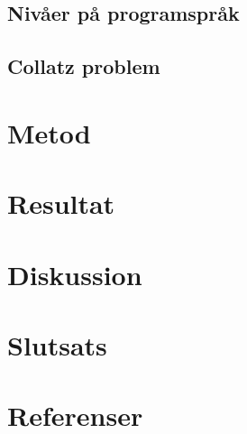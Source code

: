 \documentclass[12pt,swedish]{article}
\begin{document}
    \subsection{Nivåer på programspråk}
    \subsection{Collatz problem}

    \section{Metod}

    \section{Resultat}

    \section{Diskussion}

    \section{Slutsats}

    \section{Referenser}
    \printbibliography
\end{document}
